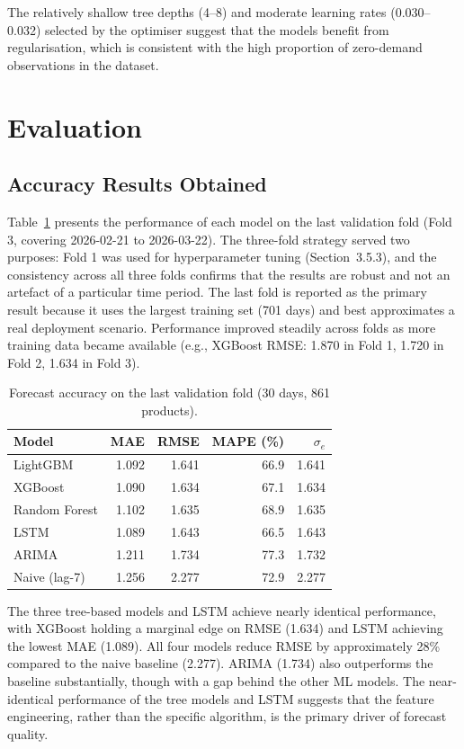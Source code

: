 The relatively shallow tree depths (4--8) and moderate learning rates (0.030--0.032) selected by the optimiser suggest that the models benefit from regularisation, which is consistent with the high proportion of zero-demand observations in the dataset.


\clearpage
\section{Evaluation}

\subsection{Accuracy Results Obtained}

Table~\ref{tab:results_summary} presents the performance of each model on the last validation fold (Fold 3, covering 2026-02-21 to 2026-03-22). The three-fold strategy served two purposes: Fold 1 was used for hyperparameter tuning (Section~3.5.3), and the consistency across all three folds confirms that the results are robust and not an artefact of a particular time period. The last fold is reported as the primary result because it uses the largest training set (701 days) and best approximates a real deployment scenario. Performance improved steadily across folds as more training data became available (e.g., XGBoost RMSE: 1.870 in Fold 1, 1.720 in Fold 2, 1.634 in Fold 3).

\begin{table}[H]
\centering
\small
\caption{Forecast accuracy on the last validation fold (30 days, 861 products).}
\label{tab:results_summary}
\begin{tabular}{|l|r|r|r|r|}
\hline
\textbf{Model} & \textbf{MAE} & \textbf{RMSE} & \textbf{MAPE (\%)} & \textbf{$\sigma_e$} \\
\hline
LightGBM & 1.092 & 1.641 & 66.9 & 1.641 \\
XGBoost & 1.090 & 1.634 & 67.1 & 1.634 \\
Random Forest & 1.102 & 1.635 & 68.9 & 1.635 \\
LSTM & 1.089 & 1.643 & 66.5 & 1.643 \\
ARIMA & 1.211 & 1.734 & 77.3 & 1.732 \\
Naive (lag-7) & 1.256 & 2.277 & 72.9 & 2.277 \\
\hline
\end{tabular}
\end{table}

The three tree-based models and LSTM achieve nearly identical performance, with XGBoost holding a marginal edge on RMSE (1.634) and LSTM achieving the lowest MAE (1.089). All four models reduce RMSE by approximately 28\% compared to the naive baseline (2.277). ARIMA (1.734) also outperforms the baseline substantially, though with a gap behind the other ML models. The near-identical performance of the tree models and LSTM suggests that the feature engineering, rather than the specific algorithm, is the primary driver of forecast quality.

